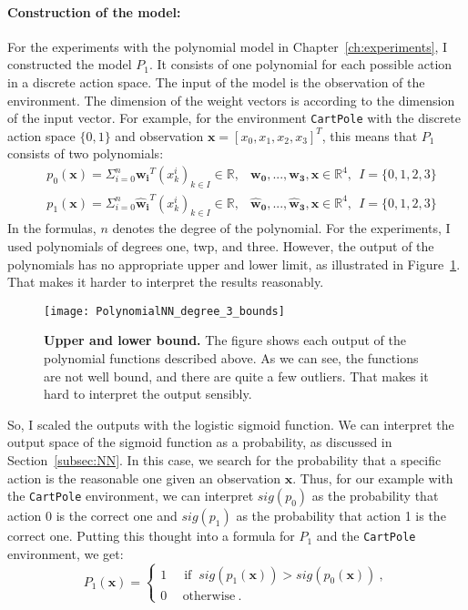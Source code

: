 \paragraph*{Construction of the model:} For the experiments with the polynomial model in Chapter~\ref{ch:experiments}, I constructed the model $P_1$. It consists of one polynomial for each possible action in a discrete action space. The input of the model is the observation of the environment. The dimension of the weight vectors is according to the dimension of the input vector. For example, for the environment \verb|CartPole| with the discrete action space $\{0, 1\}$ and observation $\mathbf{x} = [x_0, x_1, x_2, x_3]^T$, this means that $P_1$ consists of two polynomials:
\begin{align*}
  &p_0(\mathbf{x}) = \Sigma_{i=0}^{n} \mathbf{w_i}^T (x_k^i)_{k \in I} \in \mathbb{R}, &\mathbf{w_0}, ..., \mathbf{w_3}, \mathbf{x} \in \mathbb{R}^4, \ \ I = \{0, 1, 2, 3\} \\
  &p_1(\mathbf{x}) = \Sigma_{i=0}^{n} \mathbf{\hat{w}_i}^T (x_k^i)_{k \in I} \in \mathbb{R}, &\mathbf{\hat{w}_0}, ..., \mathbf{\hat{w}_3}, \mathbf{x} \in \mathbb{R}^4, \ \ I = \{0, 1, 2, 3\}
\end{align*}
In the formulas, $n$ denotes the degree of the polynomial. For the experiments, I used polynomials of degrees one, twp, and three. However, the output of the polynomials has no appropriate upper and lower limit, as illustrated in Figure~\ref{fig:bounds}. That makes it harder to interpret the results reasonably.
\begin{figure}[ht]
\centering
\texttt{[image: PolynomialNN\_degree\_3\_bounds]}
\caption[Upper and lower bound]{
  \textbf{Upper and lower bound.}
  The figure shows each output of the polynomial functions described above. As we can see, the functions are not well bound, and there are quite a few outliers. That makes it hard to interpret the output sensibly.
}
\label{fig:bounds}
\end{figure}
So, I scaled the outputs with the logistic sigmoid function. We can interpret the output space of the sigmoid function as a probability, as discussed in Section~\ref{subsec:NN}. In this case, we search for the probability that a specific action is the reasonable one given an observation $\mathbf{x}$. Thus, for our example with the \verb|CartPole| environment, we can interpret $sig(p_0)$ as the probability that action 0 is the correct one and $sig(p_1)$ as the probability that action 1 is the correct one. Putting this thought into a formula for $P_1$ and the \verb|CartPole| environment, we get:
\[
  P_1(\mathbf{x}) =
  \begin{cases}1~&{\text{ if }}~sig(p_1(\mathbf{x})) > sig(p_0(\mathbf{x}))~,\\0~&~\text{otherwise}~.\end{cases}
\]


